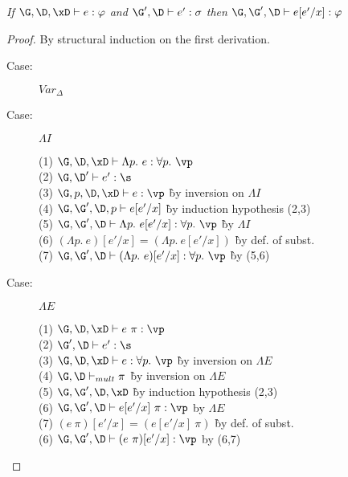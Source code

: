 
\begin{lemma}
\emph{If $\G, \D, \xD \vdash e : \varphi$ and $\G', \D \vdash e' : \sigma$
        then $\G, \G', \D \vdash e[e'/x] : \varphi$}
\end{lemma}
\begin{proof}
By structural induction on the first derivation.

\begin{description}

\item[Case:] $Var_\Delta$
\begin{tabbing}
\end{tabbing}

\item[Case:] $\Lambda I$
\begin{tabbing}
    (1) $\G,\D, \xD \vdash \Lambda p.~e : \forall p.~\vp$\\
    (2) $\G, \D' \vdash e' : \s$\\
    (3) $\G, p, \D, \xD \vdash e : \vp$ \` by inversion on $\Lambda I$\\
    (4) $\G, \G', \D, p \vdash e[e'/x]$ \` by induction hypothesis (2,3)\\
    (5) $\G, \G', \D \vdash \Lambda p.~e[e'/x] : \forall p.~\vp$ \` by $\Lambda I$ \\
    (6) $(\Lambda p.~e)[e'/x] = (\Lambda p.~e[e'/x])$ \` by def. of subst.\\
    (7) $\G, \G', \D \vdash (\Lambda p.~e)[e'/x] : \forall p.~\vp$ \` by (5,6)\\
\end{tabbing}

\item[Case:] $\Lambda E$
\begin{tabbing}
    (1) $\G, \D, \xD \vdash e~\pi : \vp$\\
    (2) $\G', \D \vdash e' : \s$\\
    (3) $\G, \D, \xD \vdash e : \forall p.~\vp$ \` by inversion on $\Lambda E$\\
    (4) $\G, \D \vdash_{mult} \pi$ \` by inversion on $\Lambda E$\\
    (5) $\G, \G', \D, \xD$ \` by induction hypothesis (2,3)\\
    (6) $\G, \G', \D \vdash e[e'/x]~\pi : \vp$ by $\Lambda E$\\
    (7) $(e~\pi)[e'/x] = (e[e'/x]~\pi)$ \` by def. of subst.\\
    (6) $\G, \G', \D \vdash (e~\pi)[e'/x] : \vp$ by (6,7)\\
\end{tabbing}


\end{description}
\end{proof}
